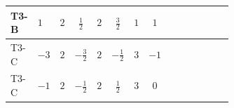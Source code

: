 \documentclass[8pt]{article}
\begin{document}
\begin{landscape}
\begin{longtable}{@{}llcccccc >{\raggedright\arraybackslash}p{0.21\linewidth} >{\raggedright\arraybackslash}p{0.21\linewidth} >{\raggedright\arraybackslash}p{0.21\linewidth}@{}}
T3-B & $1$ & $2$ & $\frac{1}{2}$ & $2$ & $\frac{3}{2}$ & $1$ & $1$ & \scriptsize\adjustbox{max width=\linewidth}{$\begin{gathered} +\frac{3}{2} (\left({Y_d}\,\left({Y_d}\right)^{\dagger}\,{Y_d}\right)_{ij}-\left({Y_u}\,\left({Y_u}\right)^{\dagger}\,{Y_d}\right)_{ij})\end{gathered}$} & \scriptsize\adjustbox{max width=\linewidth}{$\begin{gathered} -\frac{9}{4} {g_2}^2 \left({Y_d}\right)_{ij}\end{gathered}$} & \scriptsize\adjustbox{max width=\linewidth}{$\begin{gathered} -8 {g_3}^2 \left({Y_d}\right)_{ij}\end{gathered}$} \\
\midrule
T3-C & $-3$ & $2$ & $-\frac{3}{2}$ & $2$ & $-\frac{1}{2}$ & $3$ & $-1$ & \scriptsize\adjustbox{max width=\linewidth}{$\begin{gathered} +\frac{3}{2} (\left({Y_d}\,\left({Y_d}\right)^{\dagger}\,{Y_d}\right)_{ij}-\left({Y_u}\,\left({Y_u}\right)^{\dagger}\,{Y_d}\right)_{ij})\end{gathered}$} & \scriptsize\adjustbox{max width=\linewidth}{$\begin{gathered} -\frac{9}{4} {g_2}^2 \left({Y_d}\right)_{ij}\end{gathered}$} & \scriptsize\adjustbox{max width=\linewidth}{$\begin{gathered} -8 {g_3}^2 \left({Y_d}\right)_{ij}\end{gathered}$} \\
\midrule
T3-C & $-1$ & $2$ & $-\frac{1}{2}$ & $2$ & $\frac{1}{2}$ & $3$ & $0$ & \scriptsize\adjustbox{max width=\linewidth}{$\begin{gathered} +\frac{3}{2} (\left({Y_d}\,\left({Y_d}\right)^{\dagger}\,{Y_d}\right)_{ij}-\left({Y_u}\,\left({Y_u}\right)^{\dagger}\,{Y_d}\right)_{ij})\end{gathered}$} & \scriptsize\adjustbox{max width=\linewidth}{$\begin{gathered} -\frac{9}{4} {g_2}^2 \left({Y_d}\right)_{ij}\end{gathered}$} & \scriptsize\adjustbox{max width=\linewidth}{$\begin{gathered} -8 {g_3}^2 \left({Y_d}\right)_{ij}\end{gathered}$} \\
\midrule

\end{longtable}
\end{landscape}
\end{document}
